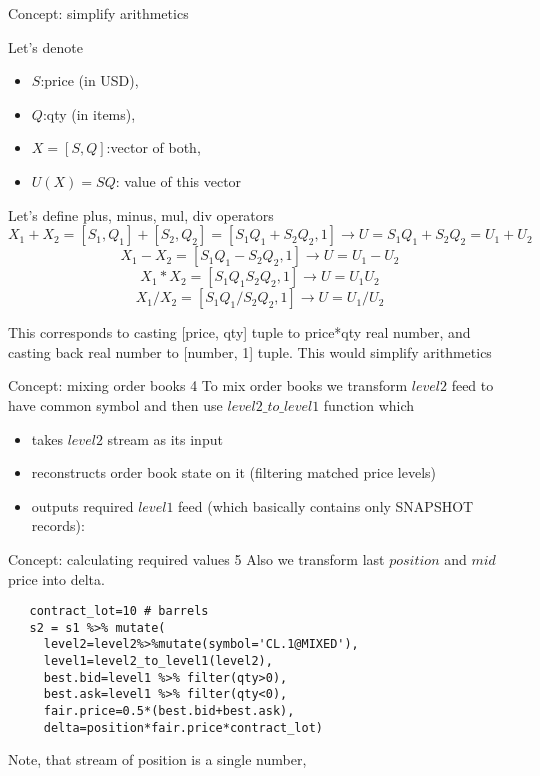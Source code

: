 \documentclass[10pt]{beamer}
\begin{document}
\begin{frame}[fragile]{Concept: simplify arithmetics}

Let's denote 
\begin{itemize}
	\item $S$:price (in USD), 
	\item $Q$:qty (in items), 
	\item $X=[S,Q]$:vector of both,
	\item $U(X)=SQ$: value of this vector
\end{itemize}

Let's define plus, minus, mul, div operators
$$X_1+X_2=[S_1,Q_1]+[S_2,Q_2]=[S_1Q_1+S_2Q_2, 1] \rightarrow
U=S_1Q_1+S_2Q_2=U_1+U_2$$
$$X_1-X_2=[S_1Q_1-S_2Q_2, 1] \rightarrow U=U_1-U_2$$
$$X_1*X_2=[S_1Q_1S_2Q_2,1]\rightarrow U=U_1U_2$$
$$X_1/X_2=[S_1Q_1/S_2Q_2,1]\rightarrow U=U_1/U_2$$

This corresponds to casting [price, qty] tuple to price*qty real number, and casting back real number to [number, 1] tuple.
This would simplify arithmetics
\end{frame}

\begin{frame}[fragile]{Concept: mixing order books 4}
To mix order books we transform $level2$ feed to have common symbol and then
use $level2\_to\_level1$ function which
\begin{itemize}
	\item takes $level2$ stream as its input
	\item reconstructs order book state on it (filtering matched price levels)
	\item outputs required $level1$ feed (which basically contains only SNAPSHOT records):
\end{itemize}
\end{frame}

\begin{frame}[fragile]{Concept: calculating required values 5}
Also we transform last $position$ and $mid$  price into delta.
\begin{lstlisting}
   contract_lot=10 # barrels
   s2 = s1 %>% mutate(
     level2=level2%>%mutate(symbol='CL.1@MIXED'),
     level1=level2_to_level1(level2),
     best.bid=level1 %>% filter(qty>0),
     best.ask=level1 %>% filter(qty<0),
     fair.price=0.5*(best.bid+best.ask),
     delta=position*fair.price*contract_lot)
\end{lstlisting}

Note, that stream of position is a single number,
\end{frame}
\end{document}
